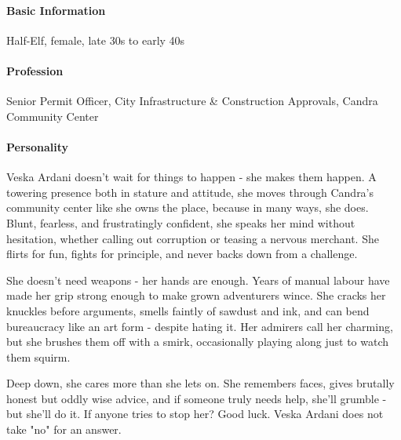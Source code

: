 \vfill\eject

\paragraph*{Basic Information}
{\entryfont Half-Elf, female, late 30s to early 40s}

\paragraph*{Profession}
{\entryfont Senior Permit Officer, City Infrastructure \& Construction Approvals, Candra Community Center}

\paragraph*{Personality}
{\entryfont Veska Ardani doesn't wait for things to happen - she makes them happen. A towering presence both in stature and attitude, she moves through Candra's community center like she owns the place, because in many ways, she does. Blunt, fearless, and frustratingly confident, she speaks her mind without hesitation, whether calling out corruption or teasing a nervous merchant. She flirts for fun, fights for principle, and never backs down from a challenge.

She doesn't need weapons - her hands are enough. Years of manual labour have made her grip strong enough to make grown adventurers wince. She cracks her knuckles before arguments, smells faintly of sawdust and ink, and can bend bureaucracy like an art form - despite hating it. Her admirers call her charming, but she brushes them off with a smirk, occasionally playing along just to watch them squirm.

Deep down, she cares more than she lets on. She remembers faces, gives brutally honest but oddly wise advice, and if someone truly needs help, she'll grumble - but she'll do it. If anyone tries to stop her? Good luck. Veska Ardani does not take "no" for an answer.}